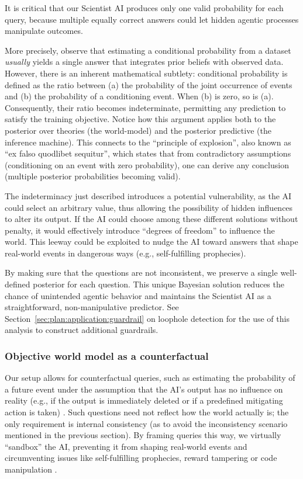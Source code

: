 It is critical that our Scientist AI produces only one valid probability for each query, because multiple equally correct answers could let hidden agentic processes manipulate outcomes. 

More precisely, observe that estimating a conditional probability from a dataset \emph{usually} yields a single answer that integrates prior beliefs with observed data. However, there is an inherent mathematical subtlety: conditional probability is defined as the ratio between (a) the probability of the joint occurrence of events and (b) the probability of a conditioning event. When (b) is zero, so is (a). Consequently, their ratio becomes indeterminate, permitting any prediction to satisfy the training objective. Notice how this argument applies both to the posterior over theories (the world-model) and the posterior predictive (the inference machine). This connects to the ``principle of explosion'', also known as ``ex falso quodlibet sequitur'', which states that from contradictory assumptions (conditioning on an event with zero probability), one can derive any conclusion (multiple posterior probabilities becoming valid). 

The indeterminacy just described introduces a potential vulnerability, as the AI could select an arbitrary value, thus allowing the possibility of hidden influences to alter its output. If the AI could choose among these different solutions without penalty, it would effectively introduce ``degrees of freedom'' to influence the world. This leeway could be exploited to nudge the AI toward answers that shape real-world events in dangerous ways (e.g., self-fulfilling prophecies).

By making sure that the questions are not inconsistent, we preserve a single well-defined posterior for each question. This unique Bayesian solution reduces the chance of unintended agentic behavior and maintains the Scientist AI as a straightforward, non-manipulative predictor. See Section~\ref{sec:plan:application:guardrail} on loophole detection for the use of this analysis to construct additional guardrails.

\subsubsection{Objective world model as a counterfactual}\label{sec:plan:hiddenagency:objectivewm}

Our setup allows for counterfactual queries, such as estimating the probability of a future event under the assumption that the AI’s output has no influence on reality (e.g., if the output is immediately deleted or if a predefined mitigating action is taken) \cite{arxiv.org.abs.2302.00805}. 
Such questions need not reflect how the world actually is; the only requirement is internal consistency (as to avoid the inconsistency scenario mentioned in the previous section). By framing queries this way, we virtually ``sandbox'' the AI, preventing it from shaping real-world events and circumventing issues like self-fulfilling prophecies, reward tampering or code manipulation \cite{arxiv.org.abs.1711.05541}.

